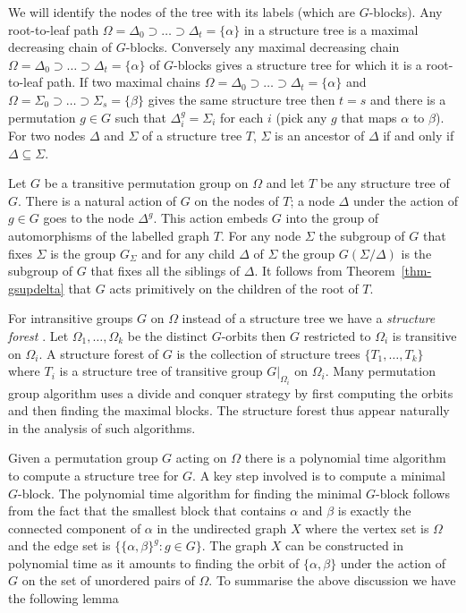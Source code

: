 \documentclass[11pt]{madras}%
\theoremstyle{remark}
\newcommand{\pr}[2]{{\ensuremath{\left.{#1}\right\vert_{#2}}}}
\newcommand{\Gof}[2][G]{{\ensuremath{#1\left(#2\right)}}}
\begin{document}
We will identify the nodes of the tree with its labels (which are
$G$-blocks).  Any root-to-leaf path $\Omega = \Delta_0 \supset \ldots
\supset \Delta_t = \{ \alpha \}$ in a structure tree is a maximal
decreasing chain of $G$-blocks.  Conversely any maximal decreasing
chain $\Omega = \Delta_0 \supset \ldots \supset \Delta_t = \{ \alpha
\}$ of $G$-blocks gives a structure tree for which it is a
root-to-leaf path.  If two maximal chains $\Omega = \Delta_0 \supset
\ldots \supset \Delta_t = \{ \alpha \}$ and $\Omega = \Sigma_0 \supset
\ldots \supset \Sigma_s = \{ \beta \}$ gives the same structure tree
then $t = s$ and there is a permutation $g \in G$ such that
$\Delta_i^g = \Sigma_i$ for each $i$ (pick any $g$ that maps $\alpha$
to $\beta$). For two nodes $\Delta$ and $\Sigma$ of a structure tree
$T$, $\Sigma$ is an ancestor of $\Delta$ if and only if $\Delta
\subseteq \Sigma$.

Let $G$ be a transitive permutation group on $\Omega$ and let $T$ be
any structure tree of $G$. There is a natural action of $G$ on the
nodes of $T$; a node $\Delta$ under the action of $g\in G$ goes to the
node $\Delta^g$. This action embeds $G$ into the group of
automorphisms of the labelled graph $T$. For any node $\Sigma$ the
subgroup of $G$ that fixes $\Sigma$ is the group $G_\Sigma$ and for
any child $\Delta$ of $\Sigma$ the group $\Gof{\Sigma/\Delta}$ is the
subgroup of $G$ that fixes all the siblings of $\Delta$. It follows
from Theorem~\ref{thm-gsupdelta} that $G$ acts primitively on the
children of the root of $T$.

For intransitive groups $G$ on $\Omega$ instead of a structure tree we
have a \emph{structure forest} . Let
$\Omega_1,\ldots,\Omega_k$ be the distinct $G$-orbits then $G$
restricted to $\Omega_i$ is transitive on $\Omega_i$. A structure
forest of $G$ is the collection of structure trees
$\{T_1,\ldots,T_k\}$ where $T_i$ is a structure tree of transitive
group $\pr{G}{\Omega_i}$ on $\Omega_i$. Many permutation group
algorithm uses a divide and conquer strategy by first computing the
orbits and then finding the maximal blocks. The structure forest thus
appear naturally in the analysis of such algorithms.

Given a permutation group $G$ acting on $\Omega$ there is a polynomial
time algorithm to compute a structure tree for $G$. A key step
involved is to compute a minimal $G$-block.  The polynomial time
algorithm for finding the minimal $G$-block follows from the fact that
the smallest block that contains $\alpha$ and $\beta$ is exactly the
connected component of $\alpha$ in the undirected graph $X$ where the
vertex set is $\Omega$ and the edge set is $\{ \{\alpha,\beta\}^g : g
\in G \}$. The graph $X$ can be constructed in polynomial time as it
amounts to finding the orbit of $\{ \alpha, \beta \}$ under the action
of $G$ on the set of unordered pairs of $\Omega$.  To summarise the
above discussion we have the following lemma~\cite[Lemma
1.3]{luks82bounded}
\end{document}
